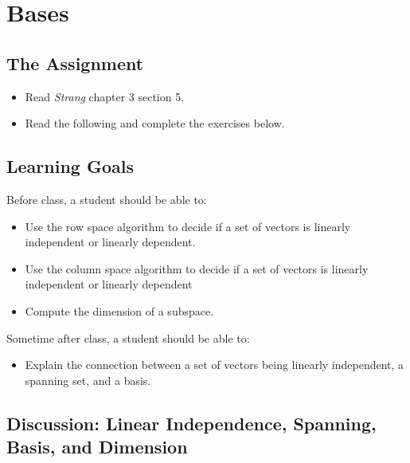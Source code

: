 \documentclass[10pt,]{book}
\theoremstyle{plain}
\theoremstyle{definition}
\numberwithin{equation}{section}
\begin{document}
\clearpage
\typeout{************************************************}
\typeout{************************************************}
\section[Bases]{Bases}\label{basis}
\typeout{************************************************}
\typeout{************************************************}
\subsection[The Assignment]{The Assignment}\label{subsection-80}
\begin{itemize}
\item{}Read \emph{Strang} chapter 3 section 5.\item{}Read the following and complete the exercises below.\end{itemize}
\typeout{************************************************}
\typeout{************************************************}
\subsection[Learning Goals]{Learning Goals}\label{subsection-81}
Before class, a student should be able to:%
\begin{itemize}
\item{}Use the row space algorithm to decide if a set of vectors is
        linearly independent or linearly dependent.\item{}Use the column space algorithm to decide if a set of vectors is
        linearly independent or linearly dependent\item{}Compute the dimension of a subspace.\end{itemize}
\par
Sometime after class, a student should be able to:%
\begin{itemize}
\item{}Explain the connection between a set of vectors being
      linearly independent, a spanning set, and a basis.\end{itemize}
\typeout{************************************************}
\typeout{************************************************}
\subsection[Discussion: Linear Independence, Spanning, Basis, and Dimension]{Discussion: Linear Independence, Spanning, Basis, and Dimension}\label{subsection-82}
\end{document}
